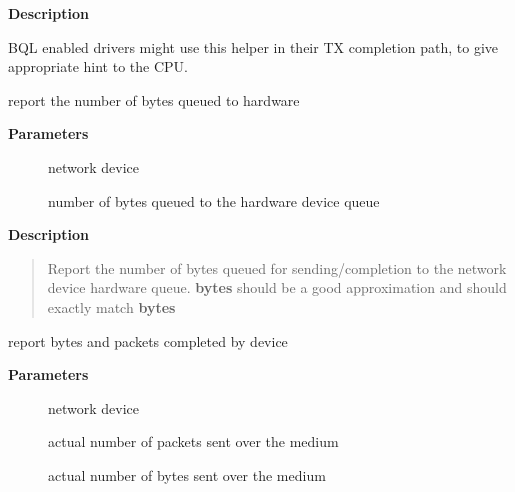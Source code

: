 \documentclass[a4paper,8pt,english]{sphinxmanual}
\begin{document}
\textbf{Description}

BQL enabled drivers might use this helper in their TX completion path,
to give appropriate hint to the CPU.

\begin{fulllineitems}
\label{networking/kapi:c.netdev_sent_queue}
report the number of bytes queued to hardware

\end{fulllineitems}


\textbf{Parameters}
\begin{description}
\item[{}] \leavevmode
network device

\item[{}] \leavevmode
number of bytes queued to the hardware device queue

\end{description}

\textbf{Description}
\begin{quote}

Report the number of bytes queued for sending/completion to the network
device hardware queue. \textbf{bytes} should be a good approximation and should
exactly match {\hyperref[networking/kapi:c.netdev_completed_queue]{\emph{}}} \textbf{bytes}
\end{quote}

\begin{fulllineitems}
\label{networking/kapi:c.netdev_completed_queue}
report bytes and packets completed by device

\end{fulllineitems}


\textbf{Parameters}
\begin{description}
\item[{}] \leavevmode
network device

\item[{}] \leavevmode
actual number of packets sent over the medium

\item[{}] \leavevmode
actual number of bytes sent over the medium

\end{description}
\end{document}
